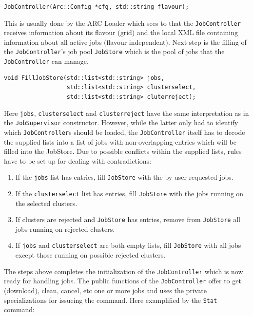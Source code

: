 \documentclass{book}
\newcommand{\JobSupervisor}{\texttt{JobSupervisor}}
\newcommand{\JobController}{\texttt{JobController}}
\begin{document}
\begin{shaded}
\begin{verbatim}
JobController(Arc::Config *cfg, std::string flavour);
\end{verbatim}
\end{shaded}

This is usually done by the ARC Loader which sees to that the {\JobController} receives information about its flavour (grid) and 
the local XML file containing information about all active jobs (flavour independent). Next step is the filling of the {\JobController}'s
job pool \texttt{JobStore} which is the pool of jobs that the {\JobController} can manage.

\begin{shaded}
\begin{verbatim}
void FillJobStore(std::list<std::string> jobs,
                  std::list<std::string> clusterselect,
                  std::list<std::string> cluterreject);
\end{verbatim}
\end{shaded}

Here \texttt{jobs}, \texttt{clusterselect} and \texttt{clusterreject} have the same interpretation as in the {\JobSupervisor} constructor. 
However, while the latter only had to identify which {\JobController}s should be loaded, the {\JobController} itself has to decode the 
supplied lists into a list of jobs with non-overlapping entries which will be filled into the JobStore. Due to possible conflicts 
within the supplied lists, rules have to be set up for dealing with contradictions:

\begin{enumerate}
\item{If the \texttt{jobs} list has entries, fill \texttt{JobStore} with the by user requested jobs.}
\item{If the \texttt{clusterselect} list has entries, fill \texttt{JobStore} with the jobs running on the selected clusters.}
\item{If clusters are rejected and \texttt{JobStore} has entries, remove from \texttt{JobStore} all jobs running on rejected clusters.}
\item{If \texttt{jobs} and \texttt{clusterselect} are both empty lists, fill \texttt{JobStore} with all jobs except those 
running on possible rejected clusters.}
\end{enumerate}

The steps above completes the initialization of the {\JobController} which is now ready for handling jobs. The public functions of the 
{\JobController} offer to get (download), clean, cancel, etc one or more jobs and uses the private specializations for issueing the command. 
Here examplified by the \texttt{Stat} command:
\end{document}
